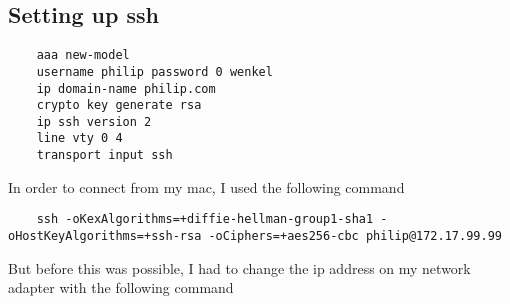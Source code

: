 \documentclass{article}
\begin{document}
\subsection{Setting up ssh}
\begin{verbatim}
	aaa new-model
	username philip password 0 wenkel
	ip domain-name philip.com
	crypto key generate rsa
	ip ssh version 2
	line vty 0 4
	transport input ssh
\end{verbatim}

In order to connect from my mac, I used the following command 

\begin{verbatim}
	ssh -oKexAlgorithms=+diffie-hellman-group1-sha1 -oHostKeyAlgorithms=+ssh-rsa -oCiphers=+aes256-cbc philip@172.17.99.99
\end{verbatim}

But before this was possible, I had to change the ip address on my network adapter with the following command
\end{document}
